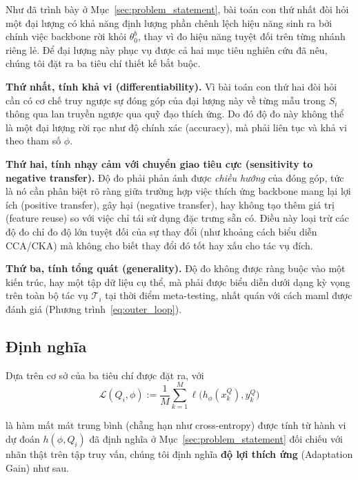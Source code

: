 Như đã trình bày ở Mục~\ref{sec:problem_statement}, bài toán con thứ nhất đòi hỏi một đại lượng có khả năng định lượng phần chênh lệch hiệu năng sinh ra bởi chính việc backbone rời khỏi $\theta_0^{b}$, thay vì đo hiệu năng tuyệt đối trên từng nhánh riêng lẻ. Để đại lượng này phục vụ được cả hai mục tiêu nghiên cứu đã nêu, chúng tôi đặt ra ba tiêu chí thiết kế bắt buộc.

\textbf{Thứ nhất, tính khả vi (differentiability).} Vì bài toán con thứ hai đòi hỏi cần có cơ chế truy ngược sự đóng góp của đại lượng này về từng mẫu trong $S_i$ thông qua lan truyền ngược qua quỹ đạo thích ứng. Do đó độ đo này không thể là một đại lượng rời rạc như độ chính xác (accuracy), mà phải liên tục và khả vi theo tham số $\phi$.

\textbf{Thứ hai, tính nhạy cảm với chuyển giao tiêu cực (sensitivity to negative transfer).} Độ đo phải phản ánh được \emph{chiều hướng} của đóng góp, tức là nó cần phân biệt rõ ràng giữa trường hợp việc thích ứng backbone mang lại lợi ích (positive transfer), gây hại (negative transfer), hay không tạo thêm giá trị (feature reuse) so với việc chỉ tái sử dụng đặc trưng sẵn có. Điều này loại trừ các độ đo chỉ đo độ lớn tuyệt đối của sự thay đổi (như khoảng cách biểu diễn CCA/CKA) mà không cho biết thay đổi đó tốt hay xấu cho tác vụ đích.

\textbf{Thứ ba, tính tổng quát (generality).} Độ đo không được ràng buộc vào một kiến trúc, hay một tập dữ liệu cụ thể, mà phải được biểu diễn dưới dạng kỳ vọng trên toàn bộ tác vụ $\mathcal{T}_i$ tại thời điểm meta-testing, nhất quán với cách \acrshort{maml} được đánh giá (Phương trình~\eqref{eq:outer_loop}).

\subsection{Định nghĩa}
\label{sec:definition_AG}

Dựa trên cơ sở của ba tiêu chí được đặt ra, với 
\begin{equation}
    \mathcal{L}(Q_i, \phi) := \frac{1}{M}\sum_{k=1}^{M} \ell\big(h_\phi(x_k^Q), y_k^Q\big)
    \label{eq:loss}
\end{equation}

là hàm mất mát trung bình (chẵng hạn như cross-entropy) được tính từ hành vi dự đoán $h(\phi, Q_i)$ đã định nghĩa ở Mục~\ref{sec:problem_statement} đối chiếu với nhãn thật trên tập truy vấn, chúng tôi định nghĩa \textbf{độ lợi thích ứng} (Adaptation Gain) như sau.

